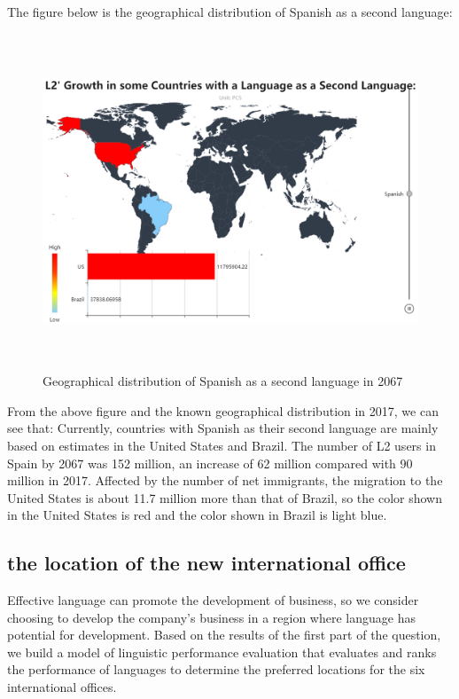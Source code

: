 \par The figure below is the geographical distribution of Spanish as a second language:

\begin{figure}[H]
	\centering
	\includegraphics[width=1\linewidth,height=10cm]{figures/Spanish}
	\caption{Geographical distribution of Spanish as a second language in 2067}
	\label{fig:spanish}
\end{figure}

\par From the above figure and the known geographical distribution in 2017, we can see that: Currently, countries with Spanish as their second language are mainly based on estimates in the United States and Brazil. The number of L2 users in Spain by 2067 was 152 million, an increase of 62 million compared with 90 million in 2017. Affected by the number of net immigrants, the migration to the United States is about 11.7 million more than that of Brazil, so the color shown in the United States is red and the color shown in Brazil is light blue. 

\subsection{the location of the new international office}

\noindent Effective language can promote the development of business, so we consider choosing to develop the company's business in a region where language has potential for development. Based on the results of the first part of the question, we build a model of linguistic performance evaluation that evaluates and ranks the performance of languages to determine the preferred locations for the six international offices.


